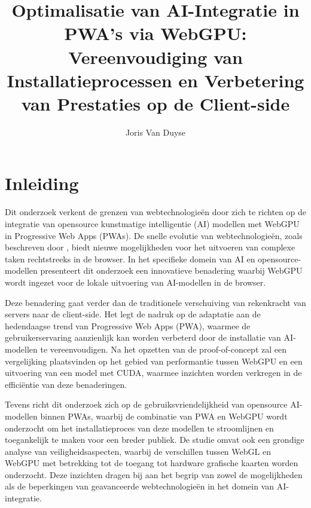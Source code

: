 \documentclass{hogent-article}
\title{Optimalisatie van AI-Integratie in PWA's via WebGPU: Vereenvoudiging van Installatieprocessen en Verbetering van Prestaties op de Client-side}
\author{Joris Van Duyse}
\begin{document}
\begin{abstract}
\end{abstract}

\tableofcontents

\bigskip

\section{Inleiding}%
\label{sec:inleiding}


Dit onderzoek verkent de grenzen van webtechnologieën door zich te richten op de integratie van opensource kunstmatige intelligentie (AI) modellen 
met WebGPU in Progressive Web Apps (PWAs). 
De snelle evolutie van webtechnologieën, zoals beschreven door \textcite{Shumylo2023}, 
biedt nieuwe mogelijkheden voor het uitvoeren van complexe taken rechtstreeks in de browser.
In het specifieke domein van AI en opensource-modellen presenteert dit onderzoek een innovatieve benadering 
waarbij WebGPU wordt ingezet voor de lokale uitvoering van AI-modellen in de browser.

\bigbreak

Deze benadering gaat verder dan de traditionele verschuiving van rekenkracht van servers naar de client-side. 
Het legt de nadruk op de adaptatie aan de hedendaagse trend van Progressive Web Apps (PWA), 
waarmee de gebruikerservaring aanzienlijk kan worden verbeterd door de installatie van AI-modellen te vereenvoudigen. 
Na het opzetten van de proof-of-concept zal een vergelijking plaatsvinden op het gebied van performantie tussen WebGPU en een uitvoering van een model met CUDA, 
waarmee inzichten worden verkregen in de efficiëntie van deze benaderingen.

\bigbreak

Tevens richt dit onderzoek zich op de gebruiksvriendelijkheid van opensource AI-modellen binnen PWAs, 
waarbij de combinatie van PWA en WebGPU wordt onderzocht om het installatieproces van deze modellen te stroomlijnen en toegankelijk te maken voor een breder publiek. 
De studie omvat ook een grondige analyse van veiligheidsaspecten, waarbij de verschillen tussen WebGL en WebGPU met betrekking tot de toegang tot hardware grafische kaarten worden onderzocht. 
Deze inzichten dragen bij aan het begrip van zowel de mogelijkheden als de beperkingen van geavanceerde webtechnologieën in het domein van AI-integratie.
\end{document}
